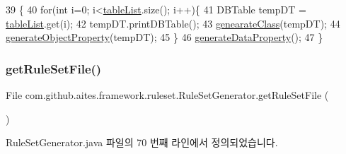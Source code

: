 \begin{DoxyCode}
39                                       \{
40         \textcolor{keywordflow}{for}(\textcolor{keywordtype}{int} i=0; i<\mbox{\hyperlink{classcom_1_1github_1_1aites_1_1framework_1_1ruleset_1_1_rule_set_generator_ac7d8dddafc874c8c1d0bdedfec634d6d}{tableList}}.size(); i++)\{
41           DBTable tempDT = \mbox{\hyperlink{classcom_1_1github_1_1aites_1_1framework_1_1ruleset_1_1_rule_set_generator_ac7d8dddafc874c8c1d0bdedfec634d6d}{tableList}}.get(i);
42           tempDT.printDBTable();
43           \mbox{\hyperlink{classcom_1_1github_1_1aites_1_1framework_1_1ruleset_1_1_rule_set_generator_ad0255e0849361313411b61576c1b9360}{genearateClass}}(tempDT);
44           \mbox{\hyperlink{classcom_1_1github_1_1aites_1_1framework_1_1ruleset_1_1_rule_set_generator_a5bdcfcca00ceceed061f630962d19801}{generateObjectProperty}}(tempDT);
45         \}
46         \mbox{\hyperlink{classcom_1_1github_1_1aites_1_1framework_1_1ruleset_1_1_rule_set_generator_a4296b42e9174f9a211a3844b5bc0c17b}{generateDataProperty}}();
47     \}
\end{DoxyCode}
\mbox{\label{classcom_1_1github_1_1aites_1_1framework_1_1ruleset_1_1_rule_set_generator_a06d60cb8f5f3970e3741285c4a5cee23}} 
\subsubsection{\texorpdfstring{get\+Rule\+Set\+File()}{getRuleSetFile()}}
{\footnotesize\ttfamily File com.\+github.\+aites.\+framework.\+ruleset.\+Rule\+Set\+Generator.\+get\+Rule\+Set\+File (\begin{DoxyParamCaption}{ }\end{DoxyParamCaption})}



Rule\+Set\+Generator.\+java 파일의 70 번째 라인에서 정의되었습니다.


